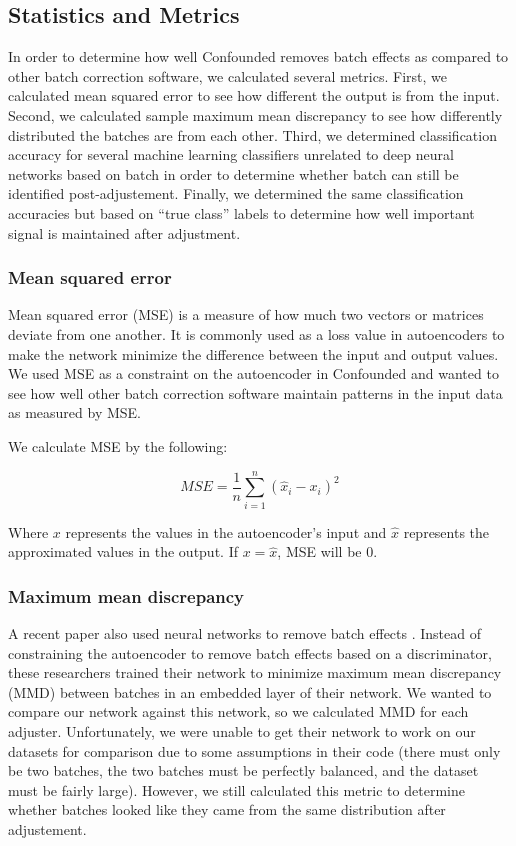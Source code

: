 \documentclass[notitlepage]{article}
\begin{document}
\subsection{Statistics and Metrics}

In order to determine how well Confounded removes batch effects as compared to other batch correction software, we calculated several metrics.
First, we calculated mean squared error to see how different the output is from the input.
Second, we calculated sample maximum mean discrepancy to see how differently distributed the batches are from each other.
Third, we determined classification accuracy for several machine learning classifiers unrelated to deep neural networks based on batch in order to determine whether batch can still be identified post-adjustement.
Finally, we determined the same classification accuracies but based on ``true class'' labels to determine how well important signal is maintained after adjustment.

\subsubsection{Mean squared error}

Mean squared error (MSE) is a measure of how much two vectors or matrices deviate from one another.
It is commonly used as a loss value in autoencoders to make the network minimize the difference between the input and output values.
We used MSE as a constraint on the autoencoder in Confounded and wanted to see how well other batch correction software maintain patterns in the input data as measured by MSE.

We calculate MSE by the following:

\begin{equation}
	\label{mse}
	MSE = \frac{1}{n}\sum_{i=1}^n{(\hat{x}_i - x_i)^2}
\end{equation}

Where $x$ represents the values in the autoencoder's input and $\hat{x}$ represents the approximated values in the output.
If $x = \hat{x}$, MSE will be 0.

\subsubsection{Maximum mean discrepancy} \label{section:mmd}

A recent paper also used neural networks to remove batch effects \cite{shaham_removal_2017}.
Instead of constraining the autoencoder to remove batch effects based on a discriminator, these researchers trained their network to minimize maximum mean discrepancy (MMD) between batches in an embedded layer of their network.
We wanted to compare our network against this network, so we calculated MMD for each adjuster.
Unfortunately, we were unable to get their network to work on our datasets for comparison due to some assumptions in their code (there must only be two batches, the two batches must be perfectly balanced, and the dataset must be fairly large).
However, we still calculated this metric to determine whether batches looked like they came from the same distribution after adjustement.
\end{document}
